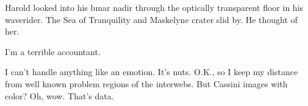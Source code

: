 \vfill
\break

Harold looked into his lunar nadir through the optically transparent
floor in his waverider.  The Sea of Tranquility and Maskelyne crater
slid by.  He thought of her.

\vfill
\break

I'm a terrible accountant.


\vfill
\break

I can't handle anything like an emotion.  It's nuts.  O.K., so I keep
my distance from well known problem regions of the interwebs.  But
Cassini images with color?  Oh, wow.  That's data.



\vfill
\bye
